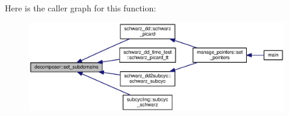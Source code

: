 Here is the caller graph for this function\+:\nopagebreak
\begin{figure}[H]
\begin{center}
\leavevmode
\includegraphics[width=350pt]{namespacedecomposer_abbcc7a95b77ad1dbec2b528470df7daf_icgraph}
\end{center}
\end{figure}


